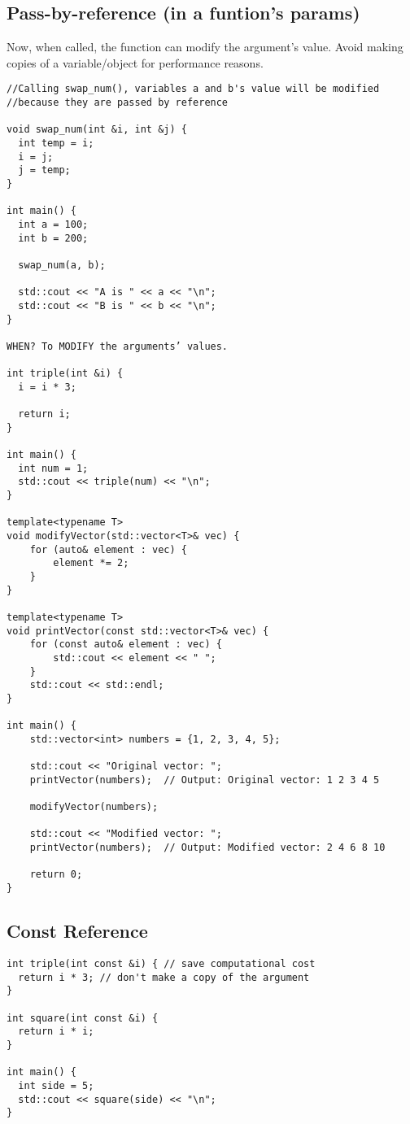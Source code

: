 \subsection{Pass-by-reference (in a funtion's params)}

Now, when called, the function can modify the argument's value.
Avoid making copies of a variable/object for performance reasons.

\begin{verbatim}
//Calling swap_num(), variables a and b's value will be modified
//because they are passed by reference

void swap_num(int &i, int &j) {
  int temp = i;
  i = j;
  j = temp;
}
 
int main() {
  int a = 100;
  int b = 200;
 
  swap_num(a, b);
 
  std::cout << "A is " << a << "\n";
  std::cout << "B is " << b << "\n";
}

WHEN? To MODIFY the arguments’ values.

int triple(int &i) {
  i = i * 3;
  
  return i;
}

int main() {
  int num = 1;
  std::cout << triple(num) << "\n";
}

template<typename T>
void modifyVector(std::vector<T>& vec) {
    for (auto& element : vec) {
        element *= 2;
    }
}

template<typename T>
void printVector(const std::vector<T>& vec) {
    for (const auto& element : vec) {
        std::cout << element << " ";
    }
    std::cout << std::endl;
}

int main() {
    std::vector<int> numbers = {1, 2, 3, 4, 5};

    std::cout << "Original vector: ";
    printVector(numbers);  // Output: Original vector: 1 2 3 4 5

    modifyVector(numbers);

    std::cout << "Modified vector: ";
    printVector(numbers);  // Output: Modified vector: 2 4 6 8 10

    return 0;
}
\end{verbatim}

\subsection{Const Reference}

\begin{verbatim}
int triple(int const &i) { // save computational cost
  return i * 3; // don't make a copy of the argument
}

int square(int const &i) {
  return i * i;
}

int main() {
  int side = 5;
  std::cout << square(side) << "\n";
}
\end{verbatim}

